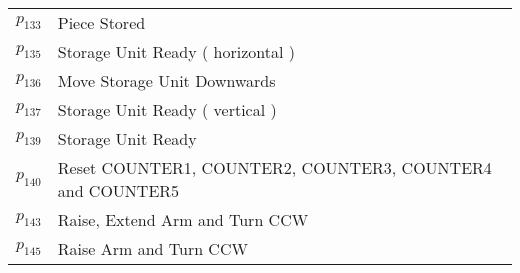 \begin{longtable}{M{5cm}M{10cm}}
\hyperlink{completeNet:p133}{\hypertarget{completeTable:p133}{$p_{133}$}} & Piece Stored\\
\hyperlink{completeNet:p135}{\hypertarget{completeTable:p135}{$p_{135}$}} & Storage Unit Ready ( horizontal )\\
\hyperlink{completeNet:p136}{\hypertarget{completeTable:p136}{$p_{136}$}} & Move Storage Unit Downwards\\
\hyperlink{completeNet:p137}{\hypertarget{completeTable:p137}{$p_{137}$}} & Storage Unit Ready ( vertical )\\
\hyperlink{completeNet:p139}{\hypertarget{completeTable:p139}{$p_{139}$}} & Storage Unit Ready\\
\hyperlink{completeNet:p140}{\hypertarget{completeTable:p140}{$p_{140}$}} & Reset COUNTER1, COUNTER2, COUNTER3, COUNTER4 and COUNTER5\\
\hyperlink{completeNet:p143}{\hypertarget{completeTable:p143}{$p_{143}$}} & Raise, Extend Arm and Turn CCW\\
\hyperlink{completeNet:p145}{\hypertarget{completeTable:p145}{$p_{145}$}} & Raise Arm and Turn CCW\\
\end{longtable}
